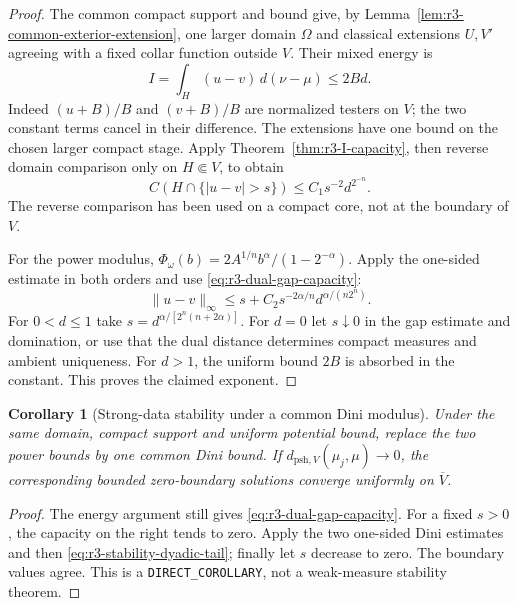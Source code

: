 \documentclass[11pt,a4paper]{article}
\numberwithin{equation}{section}
\newtheorem{corollary}[theorem]{Corollary}
\theoremstyle{definition}
\theoremstyle{remark}
\begin{document}
\begin{proof}
The common compact support and bound give, by
Lemma~\ref{lem:r3-common-exterior-extension}, one larger domain
$\Omega$ and classical extensions $U,V'$ agreeing with a fixed
collar function outside $V$. Their mixed energy is
\[
 I=\int_H(u-v)\,d(\nu-\mu)\leq2B d.
\]
Indeed $(u+B)/B$ and $(v+B)/B$ are normalized testers on $V$;
the two constant terms cancel in their difference. The extensions
have one bound on the chosen larger compact stage. Apply
Theorem~\ref{thm:r3-I-capacity}, then reverse domain comparison
only on $H\Subset V$, to obtain
\begin{equation}\label{eq:r3-dual-gap-capacity}
 C(H\cap\{|u-v|>s\})\leq C_1s^{-2}d^{2^{-n}}.
\end{equation}
The reverse comparison has been used on a compact core, not at
the boundary of $V$.

For the power modulus, $\Phi_\omega(b)=
2A^{1/n}b^\alpha/(1-2^{-\alpha})$. Apply the one-sided estimate
in both orders and use \eqref{eq:r3-dual-gap-capacity}:
\[
 \|u-v\|_\infty\leq
 s+C_2s^{-2\alpha/n}d^{\alpha/(n2^n)}.
\]
For $0<d\leq1$ take $s=d^{\alpha/[2^n(n+2\alpha)]}$.
For $d=0$ let $s\downarrow0$ in the gap estimate and domination,
or use that the dual distance determines compact measures and
ambient uniqueness. For $d>1$, the uniform bound $2B$ is absorbed
in the constant. This proves the claimed exponent.
\end{proof}

\begin{corollary}[Strong-data stability under a common Dini modulus]
\label{cor:r3-dini-dual-uniform-stability}
Under the same domain, compact support and uniform potential bound,
replace the two power bounds by one common Dini bound. If
$d_{\mathrm{psh},V}(\mu_j,\mu)\to0$, the corresponding bounded
zero-boundary solutions converge uniformly on $\overline V$.
\end{corollary}
\begin{proof}
The energy argument still gives
\eqref{eq:r3-dual-gap-capacity}. For a fixed $s>0$, the capacity
on the right tends to zero. Apply the two one-sided Dini estimates
and then \eqref{eq:r3-stability-dyadic-tail}; finally let $s$ decrease
to zero. The boundary values agree. This is a
\texttt{DIRECT\_COROLLARY}, not a weak-measure stability theorem.
\end{proof}



\end{document}
